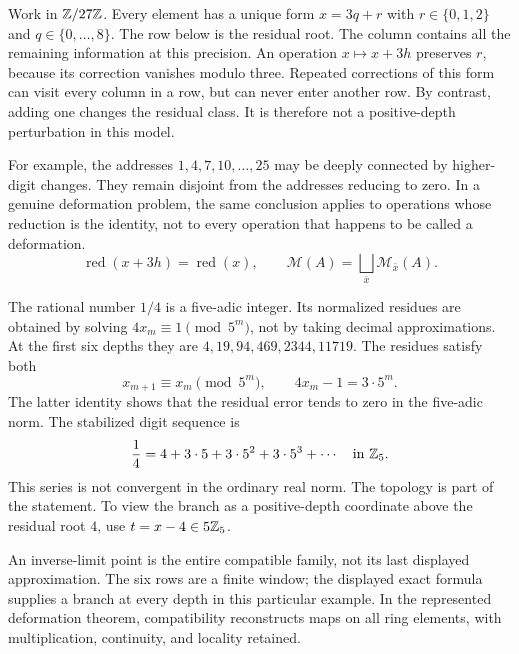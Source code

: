 Work in $\mathbb Z/27\mathbb Z$. Every element has a unique form $x=3q+r$ with $r\in\{0,1,2\}$ and $q\in\{0,\ldots,8\}$. The row below is the residual root. The column contains all the remaining information at this precision.
An operation $x\mapsto x+3h$ preserves $r$, because its correction vanishes modulo three. Repeated corrections of this form can visit every column in a row, but can never enter another row. By contrast, adding one changes the residual class. It is therefore not a positive-depth perturbation in this model.

For example, the addresses $1,4,7,10,\ldots,25$ may be deeply connected by higher-digit changes. They remain disjoint from the addresses reducing to zero. In a genuine deformation problem, the same conclusion applies to operations whose reduction is the identity, not to every operation that happens to be called a deformation.
\[
\operatorname{red}(x+3h)=\operatorname{red}(x),
\qquad
\mathcal M(A)=\bigsqcup_{\bar x}\mathcal M_{\bar x}(A).
\]

The rational number $1/4$ is a five-adic integer. Its normalized residues are obtained by solving $4x_m\equiv1\pmod{5^m}$, not by taking decimal approximations. At the first six depths they are $4,19,94,469,2344,11719$.
The residues satisfy both
\[
x_{m+1}\equiv x_m\pmod{5^m},
\qquad 4x_m-1=3\cdot5^m.
\]
The latter identity shows that the residual error tends to zero in the five-adic norm. The stabilized digit sequence is
\[
\frac14=4+3\cdot5+3\cdot5^2+3\cdot5^3+\cdots\quad\text{in }\mathbb Z_5.
\]
This series is not convergent in the ordinary real norm. The topology is part of the statement. To view the branch as a positive-depth coordinate above the residual root $4$, use $t=x-4\in5\mathbb Z_5$.

An inverse-limit point is the entire compatible family, not its last displayed approximation. The six rows are a finite window; the displayed exact formula supplies a branch at every depth in this particular example. In the represented deformation theorem, compatibility reconstructs maps on all ring elements, with multiplication, continuity, and locality retained.

